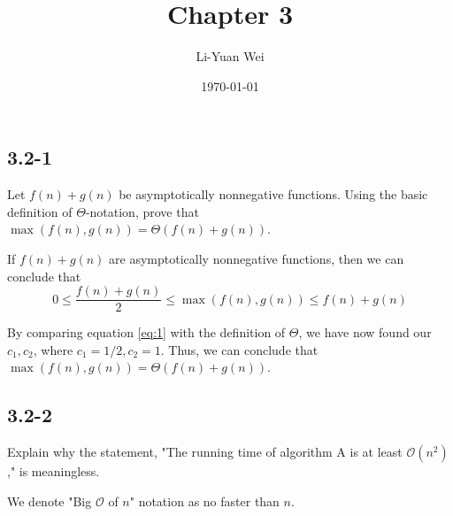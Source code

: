 \documentclass[a4paper]{article}
\makeatletter
\newenvironment{solution}
  {\begin{proof}[Solution]}
  {\end{proof}}
\renewenvironment{proof}[1][\proofname]{%
  \par\pushQED{\qed}\normalfont%
  \topsep6\p@\@plus6\p@\relax
  \trivlist\item[\hskip\labelsep\bfseries#1\@addpunct{.}]%
  \ignorespaces
}{%
  \popQED\endtrivlist\@endpefalse
}
\makeatother
\begin{document}
\title{Chapter 3}
\author{Li-Yuan Wei}
\date{\today}
\maketitle

\subsection*{3.2-1}
Let $f(n) + g(n)$ be asymptotically nonnegative functions. Using the basic definition of $\Theta$-notation, prove that $\max(f(n), g(n)) = \Theta(f(n) + g(n))$.

\begin{proof}
  If $f(n) + g(n)$ are asymptotically nonnegative functions, then we can conclude that
  \begin{equation}
    0 \le \frac{f(n) + g(n)}{2} \le \max(f(n), g(n)) \le f(n) + g(n) \label{eq:1}
  \end{equation}

  By comparing equation \ref{eq:1} with the definition of $\Theta$, we have now found our $c_1, c_2$, where $c_1 = 1/2, c_2 = 1$. Thus, we can conclude that $\max(f(n), g(n)) = \Theta(f(n) + g(n))$.
\end{proof}

\subsection*{3.2-2}
Explain why the statement, "The running time of algorithm A is at least $\mathcal{O}(n^2)$," is meaningless.

\begin{solution}
  We denote "Big $\mathcal{O}$ of $n$" notation as no faster than $n$.
\end{solution}
\end{document}

